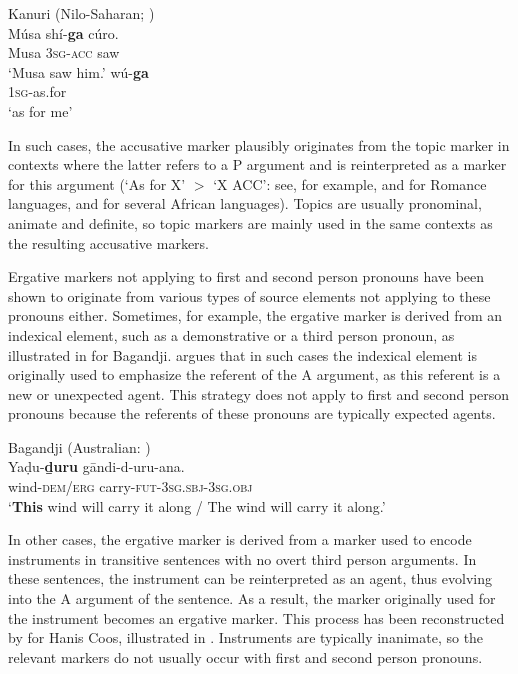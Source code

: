 \documentclass[output=paper]{langsci/langscibook}
\begin{document}
\ea\label{kanuri}
Kanuri (Nilo-Saharan; )\\
\ea
  \gll Músa sh{í}-\textbf{{ga}} cúro.\\
  Musa 3\textsc{sg-acc} saw\\
  \glt `Musa saw him.' 
  \ex
  \gll wú-\textbf{{ga}}\\
  1\textsc{sg}-as.for\\
  \glt `as for me' 

\z
\z

In such cases, the accusative marker
plausibly originates from the topic
marker in contexts where the latter refers to a P argument and  is
reinterpreted as a marker for this argument (`As for X' $>$ `X ACC': see, for example, \citealt{Rohlfs1984} and \citealt{Pensado1995} for Romance
languages, and \citealt{Konig2008} for several African languages). 
Topics are usually pronominal, animate and
definite, so topic markers
are mainly used in the same contexts as the resulting accusative
markers. 

Ergative 
\label{p:cristofaro:ergatives}
markers not applying to first and second person
pronouns have been shown to originate
from various types of source elements not applying to these pronouns
either. Sometimes, for example,  the ergative marker is derived from an indexical
element, such as a demonstrative or a third person pronoun, as
illustrated in  for Bagandji.
\citet{McGregor2006,McGregor2008} argues that in such cases the indexical
element is
originally used to emphasize the referent of the A argument, as this
referent is a new or unexpected agent. This strategy does not
    apply to  first and second person pronouns because the referents
    of these pronouns are typically expected agents.

\ea\label{bagandji}
Bagandji (Australian: )\\
\gll Yaḍu-\textbf{ḏuru} gāndi-d-uru-ana.\\
wind-\textsc{dem/erg} carry-\textsc{fut-3sg.sbj-3sg.obj}\\
\glt `{\bf This} wind will carry it along / The wind will carry it along.' 
 
\z



In other cases, the ergative marker is derived from a marker used to encode instruments
 in  transitive sentences with no overt third person arguments. In these sentences, the
  instrument can be reinterpreted as an agent, thus evolving into the A
  argument of the sentence. As a result,  the
 marker originally used for the instrument becomes an ergative marker. This process has
  been reconstructed by \citet{Mithun2005} for Hanis Coos, illustrated in
  .  Instruments are typically inanimate, so the relevant markers 
do not usually occur with first and second person pronouns.
\end{document}
